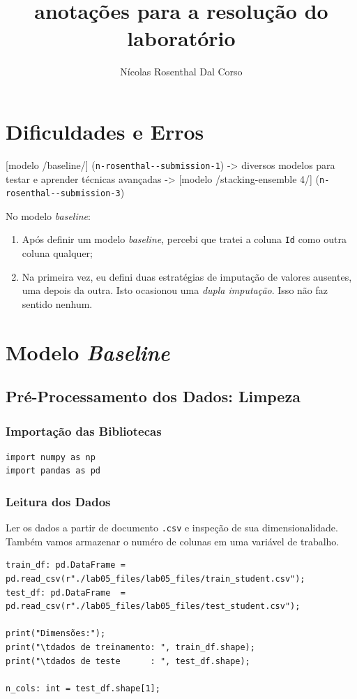 \documentclass[11pt]{article}
\author{Nícolas Rosenthal Dal Corso}
\date{\date}
\title{anotações para a resolução do laboratório}
\begin{document}
\maketitle
\tableofcontents

\section{Dificuldades e Erros}
\label{sec:orga6bcc0a}
{[}modelo /baseline/] (\texttt{n-rosenthal-{}-{}submission-1})
    ->
diversos modelos para testar e aprender técnicas avançadas
    ->
{[}modelo /stacking-ensemble 4/] (\texttt{n-rosenthal-{}-{}submission-3})


No modelo \emph{baseline}:
\begin{enumerate}
\item Após definir um modelo \emph{baseline}, percebi que tratei a coluna \texttt{Id} como outra coluna qualquer;
\item Na primeira vez, eu defini duas estratégias de imputação de valores ausentes, uma depois da outra. Isto ocasionou uma \emph{dupla imputação}. Isso não faz sentido nenhum.
\end{enumerate}
\section{Modelo \emph{Baseline}}
\label{sec:org883ef71}
\subsection{Pré-Processamento dos Dados: Limpeza}
\label{sec:org5404ad6}
\subsubsection{Importação das Bibliotecas}
\label{sec:org61bba53}

\begin{verbatim}
import numpy as np
import pandas as pd
\end{verbatim}
\subsubsection{Leitura dos Dados}
\label{sec:orgf34f21a}
Ler os dados a partir de documento \texttt{.csv} e inspeção de sua dimensionalidade. Também vamos armazenar o numéro de colunas em uma variável de trabalho.

\begin{verbatim}
train_df: pd.DataFrame = pd.read_csv(r"./lab05_files/lab05_files/train_student.csv");
test_df: pd.DataFrame  = pd.read_csv(r"./lab05_files/lab05_files/test_student.csv");

print("Dimensões:");
print("\tdados de treinamento: ", train_df.shape);
print("\tdados de teste      : ", test_df.shape);

n_cols: int = test_df.shape[1];
\end{verbatim}
\end{document}
